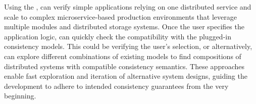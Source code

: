 Using the \sysgraph{}, \sysname{} can verify simple applications 
relying on one distributed service and scale to complex microservice-based
production environments that leverage multiple modules and distributed storage systems.
%
Once the user specifies the application logic, \sysname{} can quickly
check the compatibility with the plugged-in consistency models. This
could be verifying the user's selection, or alternatively, \sysname{}
can explore different combinations of existing models to
find compositions of distributed systems with compatible consistency semantics.
These approaches enable fast exploration and iteration of alternative
system designs, guiding the development to adhere to intended
consistency guarantees from the very beginning.



